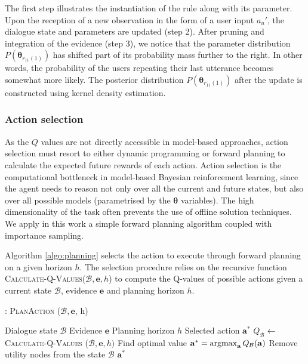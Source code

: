The first step illustrates the instantiation of the rule along with its parameter. Upon the reception of a new observation in the form of a user input $a_u'$, the dialogue state and parameters are updated (step 2). After pruning and integration of the evidence (step 3), we notice that the parameter distribution $P(\boldsymbol\theta_{r_{11}(1)})$ has shifted part of its probability mass further to the right. In other words, the probability of the users repeating their last utterance becomes somewhat more likely. The posterior distribution $P(\boldsymbol\theta_{r_{11}(1)})$ after the update is constructed using kernel density estimation. 

\subsubsection*{Action selection}

 As the $Q$ values are not directly accessible in model-based approaches, action selection must resort to either dynamic programming or forward planning to calculate the expected future rewards of each action.  Action selection is the computational bottleneck in model-based Bayesian reinforcement learning, since the agent needs to reason not only over all the current and future states, but also over all possible models (parametrised by the $\boldsymbol\theta$ variables).  The high dimensionality of the task often prevents the use of offline solution techniques. We apply in this work a simple forward planning algorithm coupled with importance sampling. 

Algorithm \ref{algo:planning} selects the action to execute through forward planning on a given horizon $h$.  The selection procedure relies on the recursive function \textsc{Calculate-Q-Values}($\mathcal{B}, \mathbf{e}, h$) to compute the Q-values of possible actions given a current state $\mathcal{B}$, evidence $\mathbf{e}$ and planning horizon $h$.  

\begin{algorithm}[h!]
\caption{: \textsc{PlanAction} ($\mathcal{B}, \mathbf{e}$, h) }
\begin{algorithmic}[1] \vspace{1mm}
\REQUIRE Dialogue state $\mathcal{B}$
\REQUIRE Evidence $\mathbf{e}$
\REQUIRE Planning horizon $h$
\ENSURE Selected action $\mathbf{a}^*$
\STATE $Q_{\mathcal{B}} \leftarrow $ \textsc{Calculate-Q-Values} ($\mathcal{B}, \mathbf{e}, h)$
\STATE Find optimal value $\mathbf{a}^* = \argmax_{\mathbf{a}} Q_{\mathcal{B}}(\mathbf{a})$
\STATE Remove utility nodes from the state $\mathcal{B}$
\RETURN $\mathbf{a}^*$
\end{algorithmic}
\label{algo:planning}
\end{algorithm}


